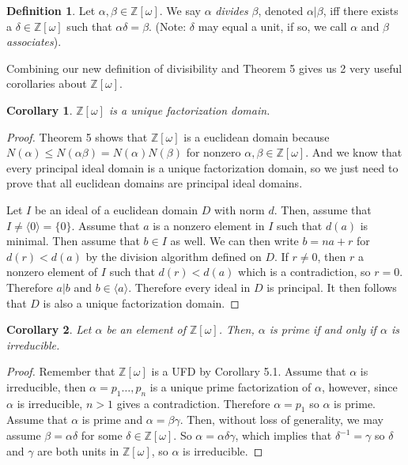 \documentclass[12pt]{amsart}
\newtheorem{corollary}{Corollary}[theorem]
\theoremstyle{definition}
\newtheorem*{definition}{Definition}
\theoremstyle{remark}
\begin{document}
\begin{definition}\label{Def:Divisibility}
    Let $\alpha,\beta\in\mathbb{Z}[\omega]$. We say $\alpha$ \textit{divides} $\beta$, denoted $\alpha | \beta$, iff there exists a $\delta\in\mathbb{Z}[\omega]$ such that $\alpha\delta=\beta$. (Note: $\delta$ may equal a unit, if so, we call $\alpha$ and $\beta$ \textit{associates}).
\end{definition}

Combining our new definition of divisibility and Theorem 5 gives us 2 very useful corollaries about $\mathbb{Z}[\omega]$.

\begin{corollary}\label{Cor:UFD}
    $\mathbb{Z}[\omega]$ is a unique factorization domain.
\end{corollary}
\begin{proof}
    Theorem 5 shows that $\mathbb{Z}[\omega]$ is a euclidean domain because $N(\alpha)\leq N(\alpha\beta)=N(\alpha)N(\beta)$ for nonzero $\alpha,\beta\in\mathbb{Z}[\omega]$. And we know that every principal ideal domain is a unique factorization domain, so we just need to prove that all euclidean domains are principal ideal domains. 
    
    Let $I$ be an ideal of a euclidean domain $D$ with norm $d$. Then, assume that $I\not=\langle 0 \rangle =\{0\}$. Assume that $a$ is a nonzero element in $I$ such that $d(a)$ is minimal. Then assume that $b\in I$ as well. We can then write $b = na+r$ for $d(r)<d(a)$ by the division algorithm defined on $D$. If $r\not=0$, then $r$ a nonzero element of $I$ such that $d(r)<d(a)$ which is a contradiction, so $r=0$. Therefore $a | b$ and $b\in\langle a\rangle$. Therefore every ideal in $D$ is principal. It then follows that $D$ is also a unique factorization domain.
\end{proof}
\begin{corollary}\label{Cor:PrimeIrred}
    Let $\alpha$ be an element of $\mathbb{Z}[\omega]$. Then, $\alpha$ is prime if and only if $\alpha$ is irreducible.
\end{corollary}
\begin{proof}
    Remember that $\mathbb{Z}[\omega]$ is a UFD by Corollary 5.1. Assume that $\alpha$ is irreducible, then $\alpha=p_1\dots,p_n$ is a unique prime factorization of $\alpha$, however, since $\alpha$ is irreducible, $n>1$ gives a contradiction. Therefore $\alpha = p_1$ so $\alpha$ is prime. Assume that $\alpha$ is prime and $\alpha = \beta\gamma$. Then, without loss of generality, we may assume $\beta=\alpha\delta$ for some $\delta\in\mathbb{Z}[\omega]$. So $\alpha = \alpha\delta\gamma$, which implies that $\delta^{-1}=\gamma$ so $\delta$ and $\gamma$ are both units in $\mathbb{Z}[\omega]$, so $\alpha$ is irreducible.
\end{proof}
\end{document}
